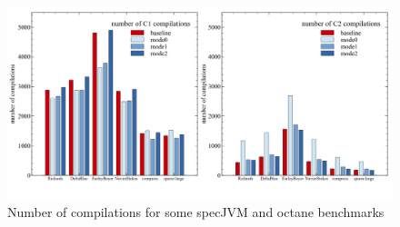 \begin{figure}[ht]
  \begin{center}
    \centering
    \includegraphics[width=1.0\textwidth]{figures/queue_total.png}
    \caption{Number of compilations for some specJVM and octane benchmarks}
    \label{f:queue_total}
  \end{center}
\end{figure}

\clearpage

